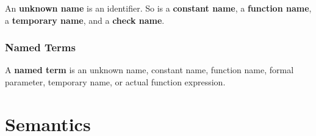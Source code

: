 \documentclass[letterpaper, 12pt]{extarticle}
\theoremstyle{definition} %
\newcommand{\textdef}[1]{\textbf{#1}}
\begin{document}
An \textdef{unknown name} is an identifier.
So is a \textdef{constant name}, a \textdef{function name},
a \textdef{temporary name}, and a \textdef{check name}.

\subsubsection{Named Terms}

A \textdef{named term} is an unknown name, constant name,
function name, formal parameter, temporary name, or
actual function expression.


\section{Semantics}

\end{document}
